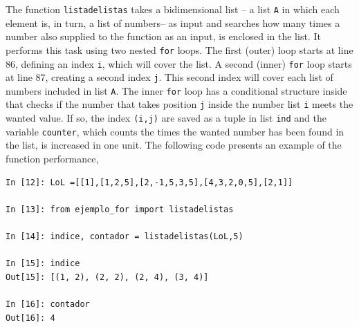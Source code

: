 \begin{paracol}{2}
The function \texttt{listadelistas} takes a bidimensional list -- a list \texttt{A} in which each element is, in turn, a list of numbers-- as input and searches how many times a number also supplied to the function as an input, is enclosed in the list. It performs this task using two nested \texttt{for} loops. The first (outer) loop starts at line $86$, defining an index \texttt{i}, which will cover the list. A second (inner) \texttt{for} loop starts at line $87$, creating a second index \texttt{j}. This second index will cover each list of numbers included in list \texttt{A}. The inner \texttt{for} loop has a conditional structure inside that checks if the number that takes position \texttt{j} inside the number list \texttt{i} meets the wanted value. If so, the index \texttt{(i,j)} are saved as a tuple in list \texttt{ind} and the variable \texttt{counter}, which counts the times the wanted number has been found in the list, is increased in one unit. The following code presents an example of the function performance,     
\end{paracol}

\begin{center}
    \begin{minipage}{.7\textwidth}
    \begin{verbatim}    
In [12]: LoL =[[1],[1,2,5],[2,-1,5,3,5],[4,3,2,0,5],[2,1]]

In [13]: from ejemplo_for import listadelistas

In [14]: indice, contador = listadelistas(LoL,5)

In [15]: indice
Out[15]: [(1, 2), (2, 2), (2, 4), (3, 4)]

In [16]: contador
Out[16]: 4
\end{verbatim}
\end{minipage}
\end{center}

